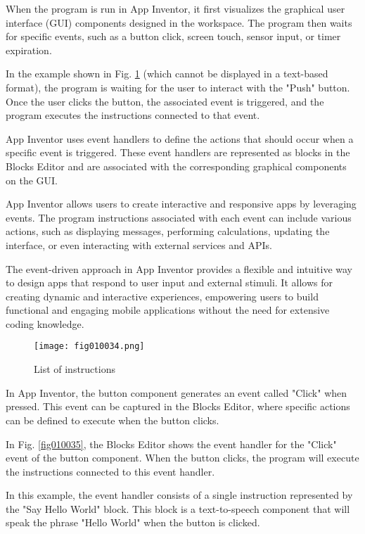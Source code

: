 When the program is run in App Inventor, it first visualizes the graphical user interface (GUI) components designed in the workspace. The program then waits for specific events, such as a button click, screen touch, sensor input, or timer expiration.

In the example shown in Fig. \ref{fig010034} (which cannot be displayed in a text-based format), the program is waiting for the user to interact with the "Push" button. Once the user clicks the button, the associated event is triggered, and the program executes the instructions connected to that event.

App Inventor uses event handlers to define the actions that should occur when a specific event is triggered. These event handlers are represented as blocks in the Blocks Editor and are associated with the corresponding graphical components on the GUI.

App Inventor allows users to create interactive and responsive apps by leveraging events. The program instructions associated with each event can include various actions, such as displaying messages, performing calculations, updating the interface, or even interacting with external services and APIs.

The event-driven approach in App Inventor provides a flexible and intuitive way to design apps that respond to user input and external stimuli. It allows for creating dynamic and interactive experiences, empowering users to build functional and engaging mobile applications without the need for extensive coding knowledge.

\begin{figure}[H]
   \centering
   \texttt{[image: fig010034.png]}
   \caption{List of instructions}
\label{fig010034}
\end{figure}

In App Inventor, the button component generates an event called "Click" when pressed. This event can be captured in the Blocks Editor, where specific actions can be defined to execute when the button clicks.

In Fig. \ref{fig010035}, the Blocks Editor shows the event handler for the "Click" event of the button component. When the button clicks, the program will execute the instructions connected to this event handler.

In this example, the event handler consists of a single instruction represented by the "Say Hello World" block. This block is a text-to-speech component that will speak the phrase "Hello World" when the button is clicked.

